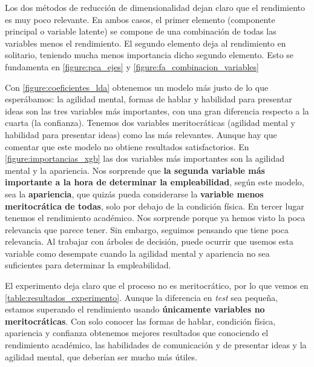 Los dos métodos de reducción de dimensionalidad dejan claro que el rendimiento es muy poco relevante. En ambos casos, el primer elemento (componente principal o variable latente) se compone de una combinación de todas las variables menos el rendimiento. El segundo elemento deja al rendimiento en solitario, teniendo mucha menos importancia dicho segundo elemento. Esto se fundamenta en \ref{figure:pca_ejes} y \ref{figure:fa_combinacion_variables}

Con \ref{figure:coeficientes_lda} obtenemos un modelo más justo de lo que esperábamos: la agilidad mental, formas de hablar y habilidad para presentar ideas son las tres variables más importantes, con una gran diferencia respecto a la cuarta (la confianza). Tenemos dos variables meritocráticas (agilidad mental y habilidad para presentar ideas) como las más relevantes. Aunque hay que comentar que este modelo no obtiene resultados satisfactorios. En \ref{figure:importancias_xgb} las dos variables más importantes son la agilidad mental y la apariencia. Nos sorprende que \textbf{la segunda variable más importante a la hora de determinar la empleabilidad}, según este modelo, sea la \textbf{apariencia}, que quizás pueda considerarse la \textbf{variable menos meritocrática de todas}, solo por debajo de la condición física. En tercer lugar tenemos el rendimiento académico. Nos sorprende porque ya hemos visto la poca relevancia que parece tener. Sin embargo, seguimos pensando que tiene poca relevancia. Al trabajar con árboles de decisión, puede ocurrir que usemos esta variable como desempate cuando la agilidad mental y apariencia no sea suficientes para determinar la empleabilidad.

El experimento deja claro que el proceso no es meritocrático, por lo que vemos en \ref{table:resultados_experimento}. Aunque la diferencia en \textit{test} sea pequeña, estamos superando el rendimiento usando \textbf{únicamente variables no meritocráticas}. Con solo conocer las formas de hablar, condición física, apariencia y confianza obtenemos mejores resultados que conociendo el rendimiento académico, las habilidades de comunicación y de presentar ideas y la agilidad mental, que deberían ser mucho más útiles.
